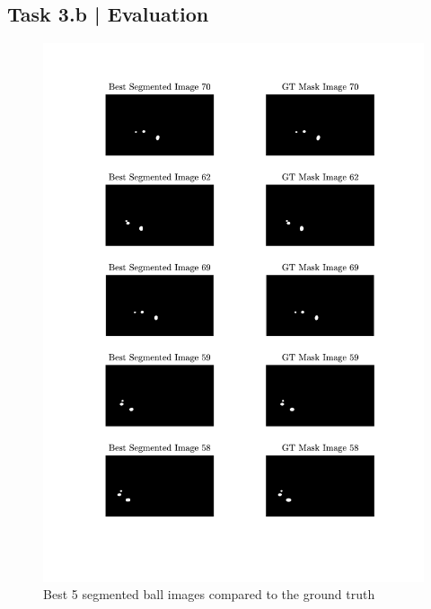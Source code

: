 \documentclass[conference]{IEEEtran}
\begin{document}
\subsection*{Task 3.b | Evaluation}

\appendix

\begin{figure}[htbp]
    \centering
    \includegraphics[width=\columnwidth]{figures/best.pdf}
    \caption{Best 5 segmented ball images compared to the ground truth\label{apx:best}}
\end{figure}
\end{document}
